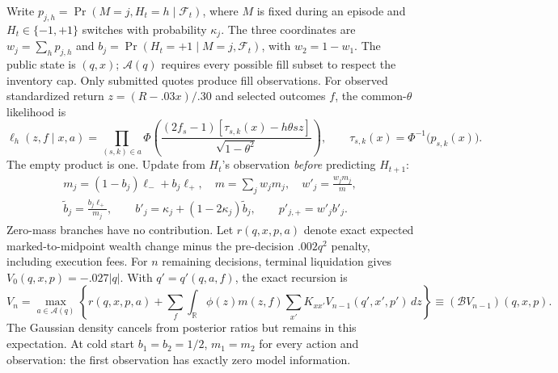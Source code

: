 Write $p_{j,h}=\Pr(M=j,H_t=h\mid\mathcal F_t)$, where $M$ is fixed during
an episode and $H_t\in\{-1,+1\}$ switches with probability $\kappa_j$.
The three coordinates are $w_j=\sum_h p_{j,h}$ and
$b_j=\Pr(H_t=+1\mid M=j,\mathcal F_t)$, with $w_2=1-w_1$.
The public state is $(q,x)$; $\mathcal A(q)$ requires every possible fill subset
to respect the inventory cap. Only submitted quotes produce fill observations.
For observed standardized return $z=(R-.03x)/.30$ and selected outcomes $f$,
the common-$\theta$ likelihood is
\begin{equation}
 \ell_h(z,f\mid x,a)=\prod_{(s,k)\in a}
 \Phi\!\left(\frac{(2f_s-1)[\tau_{s,k}(x)-h\theta sz]}
 {\sqrt{1-\theta^2}}\right),\qquad
 \tau_{s,k}(x)=\Phi^{-1}\!\bigl(p_{s,k}(x)\bigr).
\end{equation}
The empty product is one. Update from $H_t$'s observation \emph{before}
predicting $H_{t+1}$:
\begin{equation}
 \begin{gathered}
 m_j=(1-b_j)\ell_-+b_j\ell_+,\quad m=\sum_jw_jm_j,\quad
 w'_j=\frac{w_jm_j}{m},\\[-2pt]
 \widetilde b_j=\frac{b_j\ell_+}{m_j},\qquad
 b'_j=\kappa_j+(1-2\kappa_j)\widetilde b_j,
 \qquad p'_{j,+}=w'_jb'_j .
 \end{gathered}
\end{equation}
Zero-mass branches have no contribution. Let $r(q,x,p,a)$ denote exact expected
marked-to-midpoint wealth change minus the pre-decision $.002q^2$ penalty,
including execution fees. For $n$ remaining decisions, terminal liquidation
gives $V_0(q,x,p)=-.027|q|$. With $q'=q'(q,a,f)$, the exact recursion is
\begin{equation}
 V_n=\max_{a\in\mathcal A(q)}\left\{
 r(q,x,p,a)+\sum_f\int_{\mathbb R}\phi(z)m(z,f)
       \sum_{x'}K_{xx'}V_{n-1}(q',x',p')\,dz\right\}
 \equiv (\mathcal B V_{n-1})(q,x,p).
\end{equation}
The Gaussian density cancels from posterior ratios but remains in this
expectation. At cold start $b_1=b_2=1/2$, $m_1=m_2$ for every action and
observation: the first observation has exactly zero model information.

